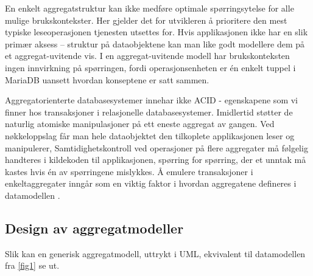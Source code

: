 En enkelt aggregatstruktur kan ikke medføre optimale spørringsytelse for alle mulige brukskontekster. Her gjelder det for utvikleren å prioritere den mest typiske leseoperasjonen tjenesten utsettes for. Hvis applikasjonen ikke har en slik primær aksess – struktur på dataobjektene kan man like godt modellere dem på et aggregat-uvitende vis. I en aggregat-uvitende modell har brukskonteksten ingen innvirkning på spørringen, fordi operasjonsenheten er én enkelt tuppel i MariaDB uansett hvordan konseptene er satt sammen.

Aggregatorienterte databasesystemer innehar ikke ACID - egenskapene som vi finner hos transaksjoner i relasjonelle databasesystemer. Imidlertid støtter de naturlig atomiske manipulasjoner på ett eneste aggregat av gangen. Ved nøkkeloppslag får man hele dataobjektet den tilkoplete applikasjonen leser og manipulerer, Samtidighetskontroll ved operasjoner på flere aggregater må følgelig handteres i kildekoden til applikasjonen, spørring for spørring, der et unntak må kastes hvis én av spørringene mislykkes. Å emulere transaksjoner i enkeltaggregater inngår som en viktig faktor i hvordan aggregatene defineres i datamodellen \citep{sadalage2013}.

\subsection{Design av aggregatmodeller}

Slik kan en generisk aggregatmodell, uttrykt i UML, ekvivalent til datamodellen fra \ref{fig1} se ut.

